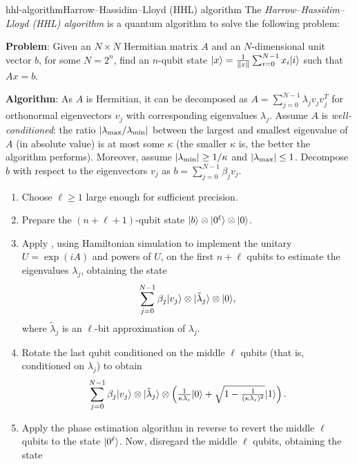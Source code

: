 \begin{topic}{hhl-algorithm}{Harrow--Hassidim--Lloyd (HHL) algorithm}
    The \emph{Harrow--Hassidim--Lloyd (HHL) algorithm} is a quantum algorithm to solve the following problem:

    \textbf{Problem}: Given an $N \times N$ Hermitian matrix $A$ and an $N$-dimensional unit vector $b$, for some $N = 2^n$, find an $n$-qubit state $|x\rangle = \frac{1}{\left\|x\right\|} \sum_{i = 0}^{N - 1} x_i |i\rangle$ such that $Ax = b$.

    \textbf{Algorithm}: As $A$ is Hermitian, it can be decomposed as $A = \sum_{j = 0}^{N - 1} \lambda_j v_j v_j^T$ for orthonormal eigenvectors $v_j$ with corresponding eigenvalues $\lambda_j$. Assume $A$ is \textit{well-conditioned}: the ratio $|\lambda_\textup{max} / \lambda_\textup{min}|$ between the largest and smallest eigenvalue of $A$ (in absolute value) is at most some $\kappa$ (the smaller $\kappa$ is, the better the algorithm performs). Moreover, assume $|\lambda_\textup{min}| \ge 1 / \kappa$ and $|\lambda_\textup{max}| \le 1$. Decompose $b$ with respect to the eigenvectors $v_j$ as $b = \sum_{j = 0}^{N - 1} \beta_j v_j$.
    \begin{enumerate}[label=(\arabic*)]
        \item Choose $\ell \ge 1$ large enough for sufficient precision.
        \item Prepare the $(n + \ell + 1)$-qubit state $|b\rangle \otimes |0^\ell\rangle \otimes |0\rangle$.
        \item Apply , using Hamiltonian simulation to implement the unitary $U = \exp(i A)$ and powers of $U$, on the first $n + \ell$ qubits to estimate the eigenvalues $\lambda_j$, obtaining the state
        \[ \sum_{j = 0}^{N - 1} \beta_j |v_j\rangle \otimes |\tilde{\lambda}_j\rangle \otimes |0\rangle , \]
        where $\tilde{\lambda}_j$ is an $\ell$-bit approximation of $\lambda_j$.
        \item Rotate the last qubit conditioned on the middle $\ell$ qubits (that is, conditioned on $\lambda_j$) to obtain
        \[ \sum_{j = 0}^{N - 1} \beta_j |v_j\rangle \otimes |\tilde{\lambda}_j\rangle \otimes \left( \tfrac{1}{\kappa \lambda_i} |0\rangle + \sqrt{1 - \tfrac{1}{(\kappa \lambda_i)^2}} |1\rangle \right) . \]
        \item Apply the phase estimation algorithm in reverse to revert the middle $\ell$ qubits to the state $|0^\ell\rangle$. Now, disregard the middle $\ell$ qubits, obtaining the state

\end{enumerate}
\end{topic}
